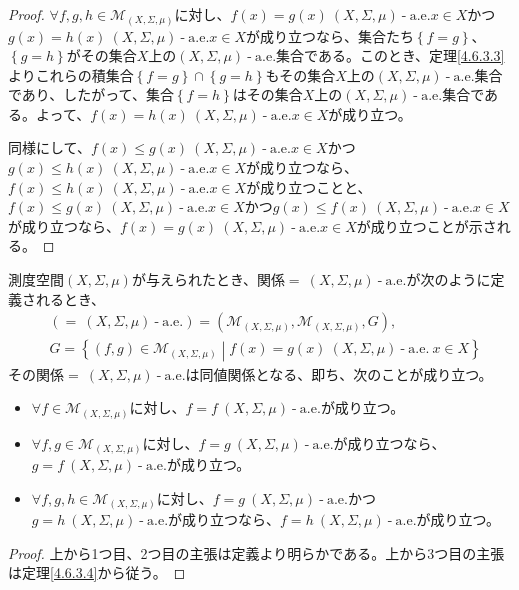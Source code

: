 \documentclass[dvipdfmx]{jsarticle}
\begin{document}
\begin{proof}
$\forall f,g,h \in \mathcal{M}_{(X,\varSigma,\mu)}$に対し、$f(x) = g(x)\ (X,\varSigma,\mu) \ \text{-} \ \mathrm{a.e.}x \in X$かつ$g(x) = h(x)\ (X,\varSigma,\mu) \ \text{-} \ \mathrm{a.e.}x \in X$が成り立つなら、集合たち$\left\{ f = g \right\}$、$\left\{ g = h \right\}$がその集合$X$上の$(X,\varSigma,\mu) \ \text{-} \ \mathrm{a.e.}$集合である。このとき、定理\ref{4.6.3.3}よりこれらの積集合$\left\{ f = g \right\} \cap \left\{ g = h \right\}$もその集合$X$上の$(X,\varSigma,\mu) \ \text{-} \ \mathrm{a.e.}$集合であり、したがって、集合$\left\{ f = h \right\}$はその集合$X$上の$(X,\varSigma,\mu) \ \text{-} \ \mathrm{a.e.}$集合である。よって、$f(x) = h(x)\ (X,\varSigma,\mu) \ \text{-} \ \mathrm{a.e.}x \in X$が成り立つ。\par
同様にして、$f(x) \leq g(x)\ (X,\varSigma,\mu) \ \text{-} \ \mathrm{a.e.}x \in X$かつ$g(x) \leq h(x)\ (X,\varSigma,\mu) \ \text{-} \ \mathrm{a.e.}x \in X$が成り立つなら、$f(x) \leq h(x)\ (X,\varSigma,\mu) \ \text{-} \ \mathrm{a.e.}x \in X$が成り立つことと、$f(x) \leq g(x)\ (X,\varSigma,\mu) \ \text{-} \ \mathrm{a.e.}x \in X$かつ$g(x) \leq f(x)\ (X,\varSigma,\mu) \ \text{-} \ \mathrm{a.e.}x \in X$が成り立つなら、$f(x) = g(x)\ (X,\varSigma,\mu) \ \text{-} \ \mathrm{a.e.}x \in X$が成り立つことが示される。
\end{proof}
\begin{thm}\label{4.6.3.4s}
測度空間$(X,\varSigma,\mu)$が与えられたとき、関係$=\ (X,\varSigma,\mu) \ \text{-} \ \mathrm{a.e.}$が次のように定義されるとき、
\begin{align*}
&\left(=\ (X,\varSigma,\mu) \ \text{-} \ \mathrm{a.e.} \right) =\left( \mathcal{M}_{(X,\varSigma,\mu)}, \mathcal{M}_{(X,\varSigma,\mu)}, G \right) ,\\
&G = \left\{ \left(f,g\right) \in \mathcal{M}_{(X,\varSigma,\mu)} \middle| f(x) =g(x) \ (X,\varSigma,\mu) \ \text{-} \ \mathrm{a.e.}\ x \in X \right\}
\end{align*}
その関係$=\ (X,\varSigma,\mu) \ \text{-} \ \mathrm{a.e.}$は同値関係となる、即ち、次のことが成り立つ。
\begin{itemize}
\item
  $\forall f \in \mathcal{M}_{(X,\varSigma,\mu)}$に対し、$f = f\ (X,\varSigma,\mu) \ \text{-} \ \mathrm{a.e.}$が成り立つ。
\item
  $\forall f,g \in \mathcal{M}_{(X,\varSigma,\mu)}$に対し、$f = g\ (X,\varSigma,\mu) \ \text{-} \ \mathrm{a.e.}$が成り立つなら、$g = f\ (X,\varSigma,\mu) \ \text{-} \ \mathrm{a.e.}$が成り立つ。
\item
$\forall f,g,h \in \mathcal{M}_{(X,\varSigma,\mu)}$に対し、$f = g\ (X,\varSigma,\mu) \ \text{-} \ \mathrm{a.e.}$かつ$g = h\ (X,\varSigma,\mu) \ \text{-} \ \mathrm{a.e.}$が成り立つなら、$f = h\ (X,\varSigma,\mu) \ \text{-} \ \mathrm{a.e.}$が成り立つ。
\end{itemize}
\end{thm}
\begin{proof}
上から1つ目、2つ目の主張は定義より明らかである。上から3つ目の主張は定理\ref{4.6.3.4}から従う。
\end{proof}
\end{document}
